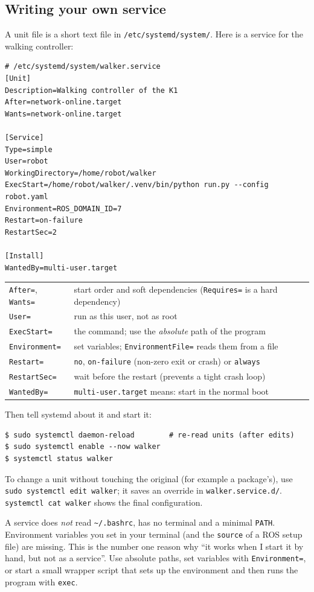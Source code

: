 \subsection*{Writing your own service}
A unit file is a short text file in \texttt{/etc/systemd/system/}. Here is a service for the walking controller:
\begin{verbatim}
# /etc/systemd/system/walker.service
[Unit]
Description=Walking controller of the K1
After=network-online.target
Wants=network-online.target

[Service]
Type=simple
User=robot
WorkingDirectory=/home/robot/walker
ExecStart=/home/robot/walker/.venv/bin/python run.py --config robot.yaml
Environment=ROS_DOMAIN_ID=7
Restart=on-failure
RestartSec=2

[Install]
WantedBy=multi-user.target
\end{verbatim}
\begin{center}
\renewcommand{\arraystretch}{1.2}
\begin{tabular}{lp{10.3cm}}
\texttt{After=}, \texttt{Wants=} & start order and soft dependencies (\texttt{Requires=} is a hard dependency)\\
\texttt{User=} & run as this user, not as root\\
\texttt{ExecStart=} & the command; use the \emph{absolute} path of the program\\
\texttt{Environment=} & set variables; \texttt{EnvironmentFile=} reads them from a file\\
\texttt{Restart=} & \texttt{no}, \texttt{on-failure} (non-zero exit or crash) or \texttt{always}\\
\texttt{RestartSec=} & wait before the restart (prevents a tight crash loop)\\
\texttt{WantedBy=} & \texttt{multi-user.target} means: start in the normal boot\\
\end{tabular}
\end{center}
Then tell systemd about it and start it:
\begin{verbatim}
$ sudo systemctl daemon-reload        # re-read units (after edits)
$ sudo systemctl enable --now walker
$ systemctl status walker
\end{verbatim}
To change a unit without touching the original (for example a package's), use \verb|sudo systemctl edit walker|; it saves an override in \texttt{walker.service.d/}. \verb|systemctl cat walker| shows the final configuration.

\begin{keyidea}
A service does \emph{not} read \texttt{\textasciitilde/.bashrc}, has no terminal and a minimal \texttt{PATH}. Environment variables you set in your terminal (and the \texttt{source} of a ROS setup file) are missing. This is the number one reason why ``it works when I start it by hand, but not as a service''. Use absolute paths, set variables with \texttt{Environment=}, or start a small wrapper script that sets up the environment and then runs the program with \texttt{exec}.
\end{keyidea}


